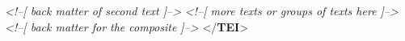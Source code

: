\documentclass[11pt,twoside]{article}\makeatletter
\begin{document}
\begin{shaded}
\hspace*{6pt}\hspace*{6pt}\hspace*{6pt}\mbox{}\newline 
\textit{<!--[ back matter of second text ]-->}\mbox{}\newline 
\hspace*{6pt}\hspace*{6pt}\hspace*{6pt}\mbox{}\newline 
\hspace*{6pt}\hspace*{6pt}\mbox{}\newline 
\textit{<!--[ more texts or groups of texts here ]-->}\mbox{}\newline 
\hspace*{6pt}\mbox{}\newline 
\hspace*{6pt}\mbox{}\newline 
\textit{<!--[ back matter for the composite  ]-->}\mbox{}\newline 
\hspace*{6pt}\mbox{}\newline 
{}\mbox{}\newline 
{</\textbf{TEI}>}\end{shaded}\egroup\par \par
\end{document}
